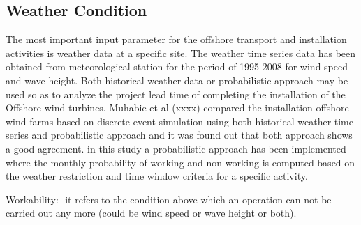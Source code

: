 \subsection{Weather Condition}

The most important input parameter for the offshore transport and installation activities is weather data at a specific site. The weather time series data has been obtained from meteorological station for the period of 1995-2008 for wind speed and wave height. Both historical weather data or probabilistic approach may be used so as to  analyze the project lead time of completing the installation of the Offshore wind turbines. Muhabie et al (xxxx) compared the installation offshore wind farms based on discrete event simulation using both historical weather time series and probabilistic approach  and it was found out that both approach shows a good agreement. in this study a probabilistic approach has been implemented where the monthly probability of working and non working is computed based on the weather restriction and time window criteria for a specific activity. 
\begin{enumerate}
\list
Workability:- it refers to the condition above which an operation can not be carried out any more (could be wind speed or wave height or both).
\end{enumerate}
